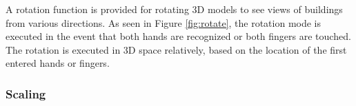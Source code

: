 A rotation function is provided for rotating 3D models to see views of buildings from various directions. As seen in Figure \ref{fig:rotate}, the rotation mode is executed in the event that both hands are recognized or both fingers are touched. The rotation is executed in 3D space relatively, based on the location of the first entered hands or fingers.


\subsubsection{Scaling}


